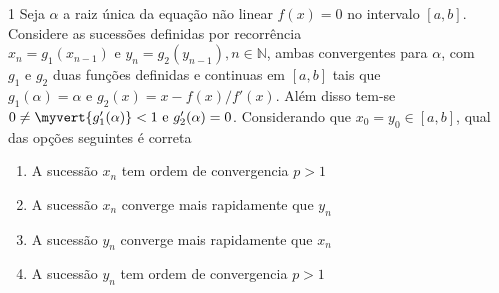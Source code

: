 \documentclass[\mainfilename]{subfiles}
\begin{document}
\begin{questionBox}1{ %
    Seja \(\alpha\) a raiz única da equação não linear \(f(x)=0\) no intervalo \([a,b]\). Considere as sucessões definidas por recorrência \(x_n=g_1(x_{n-1})\text{ e }y_n=g_2(y_{n-1}),n\in\mathbb{N}\), ambas convergentes para \(\alpha\), com \(g_1\text{ e }g_2\) duas funções definidas e continuas em \([a,b]\) tais que \(g_1(\alpha)=\alpha\text{ e }g_2(x)=x-f(x)/f'(x)\). Além disso tem-se \(0\neq\myvert{g'_1(\alpha)}<1\text{ e }g'_2(\alpha)=0\). Considerando que \(x_0=y_0\in{[a,b]}\), qual das opções seguintes é correta
} %
    \begin{enumerate}[label=\alph{enumi}.]
        \item A sucessão \textcolor{GraphA11}{\(x_n\)} tem ordem de convergencia \textcolor{GraphA15}{\(p>1\)}
        \item A sucessão \textcolor{GraphA11}{\(x_n\)} converge mais rapidamente que \textcolor{GraphA17}{\(y_n\)}
        \item A sucessão \textcolor{GraphA13}{\(y_n\)} converge mais rapidamente que \textcolor{GraphA19}{\(x_n\)}
        \item A sucessão \textcolor{GraphA13}{\(y_n\)} tem ordem de convergencia \textcolor{GraphA15}{\(p>1\)}
    \end{enumerate}
\end{questionBox}
\end{document}
